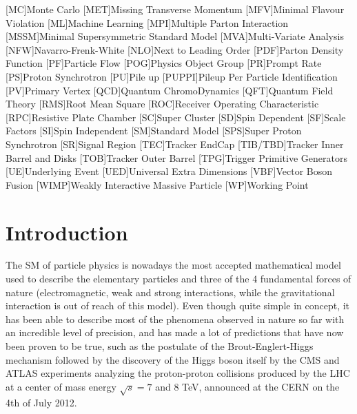 \documentclass[a4paper, 10pt, openright]{report}
\begin{document}
\begin{multicols}{2}
\begin{acronym}
[MC]{Monte Carlo}
[MET]{Missing Transverse Momentum}
[MFV]{Minimal Flavour Violation}
[ML]{Machine Learning}
[MPI]{Multiple Parton Interaction}
[MSSM]{Minimal Supersymmetric Standard Model}
[MVA]{Multi-Variate Analysis}
[NFW]{Navarro-Frenk-White}
[NLO]{Next to Leading Order}
[PDF]{Parton Density Function}
[PF]{Particle Flow}
[POG]{Physics Object Group}
[PR]{Prompt Rate}
[PS]{Proton Synchrotron}
[PU]{Pile up}
[PUPPI]{Pileup Per Particle Identification}
[PV]{Primary Vertex}
[QCD]{Quantum ChromoDynamics}
[QFT]{Quantum Field Theory}
[RMS]{Root Mean Square}
[ROC]{Receiver Operating Characteristic}
[RPC]{Resistive Plate Chamber}
[SC]{Super Cluster}
[SD]{Spin Dependent}
[SF]{Scale Factors}
[SI]{Spin Independent}
[SM]{Standard Model}
[SPS]{Super Proton Synchrotron}
[SR]{Signal Region}
[TEC]{Tracker EndCap} 
[TIB/TBD]{Tracker Inner Barrel and Disks}
[TOB]{Tracker Outer Barrel}
[TPG]{Trigger Primitive Generators}
[UE]{Underlying Event}
[UED]{Universal Extra Dimensions}
[VBF]{Vector Boson Fusion}
[WIMP]{Weakly Interactive Massive Particle}
[WP]{Working Point}

\end{acronym}
\end{multicols}
\newpage

\baselineskip
\tableofcontents
{}\baselineskip

\thispagestyle{empty}
\newpage


\clearpage
\thispagestyle{empty}
\phantom{a}
\vfill
\newpage

\setlength{\parskip}{8pt}

\chapter{Introduction}

The \acf{SM} of particle physics \cite{SM} is nowadays the most accepted mathematical model used to describe the elementary particles and three of the 4 fundamental forces of nature (electromagnetic, weak and strong interactions, while the gravitational interaction is out of reach of this model). Even though quite simple in concept, it has been able to describe most of the phenomena observed in nature so far with an incredible level of precision, and has made a lot of predictions that have now been proven to be true, such as the postulate of the Brout-Englert-Higgs mechanism \cite{HiggsPostulate1, HiggsPostulate2} followed by the discovery of the Higgs boson itself \cite{HiggsDiscovery1, HiggsDiscovery2} by the \ac{CMS} \cite{CMS} and \ac{ATLAS} \cite{ATLAS} experiments analyzing the proton-proton collisions produced by the \acf{LHC} at a center of mass energy $\sqrt{s} = 7$ and 8 TeV, announced at the \ac{CERN} on the 4th of July 2012. 
\end{document}
